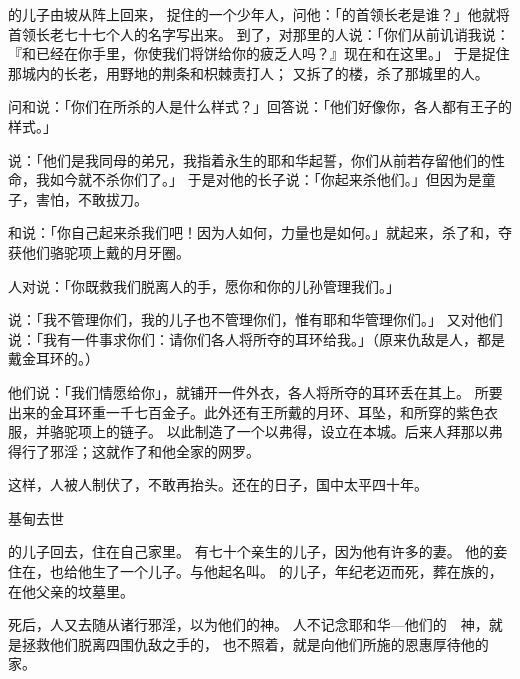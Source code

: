 {\par }{\PP {}的儿子{}由{}坡从阵上回来，
捉住{}的一个少年人，问他：「{}的首领长老是谁？」他就将首领长老七十七个人的名字写出来。
到了{}，对那里的人说：「你们从前讥诮我说：『{}和{}已经在你手里，你使我们将饼给{}你的疲乏人吗？』现在{}和{}在这里。」
于是捉住那城内的长老，用野地的荆条和枳棘责打人；
又拆了{}的楼，杀了那城里的人。
\par }{\PP {}问{}和{}说：「你们在{}所杀的人是什么样式？」回答说：「他们好像你，各人都有王子的样式。」
\par }{\PP {}说：「他们是我同母的弟兄，我指着永生的耶和华起誓，你们从前若存留他们的性命，我如今就不杀你们了。」
于是对他的长子{}说：「你起来杀他们。」但{}因为是童子，害怕，不敢拔刀。
\par }{\PP {}和{}说：「你自己起来杀我们吧！因为人如何，力量也是如何。」{}就起来，杀了{}和{}，夺获他们骆驼项上戴的月牙圈。
\par }{\PP {}人对{}说：「你既救我们脱离{}人的手，愿你和你的儿孙管理我们。」
\par }{\PP {}说：「我不管理你们，我的儿子也不管理你们，惟有耶和华管理你们。」
又对他们说：「我有一件事求你们：请你们各人将所夺的耳环给我。」（原来仇敌是{}人，都是戴金耳环的。）
\par }{\PP {}他们说：「我们情愿给你」，就铺开一件外衣，各人将所夺的耳环丢在其上。
所要出来的金耳环重一千七百{}金子。此外还有{}王所戴的月环、耳坠，和所穿的紫色衣服，并骆驼项上的{}链子。
以此制造了一个以弗得，设立在本城{}。后来{}人拜那以弗得行了邪淫；这就作了{}和他全家的网罗。
\par }{\PP {}这样，{}人被{}人制伏了，不敢再抬头。{}还在的日子，国中太平四十年。
\par }{\SH 基甸去世
\par }{\PP {}的儿子{}回去，住在自己家里。
有七十个亲生的儿子，因为他有许多的妻。
他的妾住在{}，也给他生了一个儿子。{}与他起名叫{}。
的儿子{}，年纪老迈而死，葬在{}族的{}，在他父亲{}的坟墓里。
\par }{\PP {}死后，{}人又去随从诸{}行邪淫，以{}为他们的神。
人不记念耶和华—他们的　神，就是拯救他们脱离四围仇敌之手的，
也不照着{}，就是{}向他们所施的恩惠厚待他的家。

}
